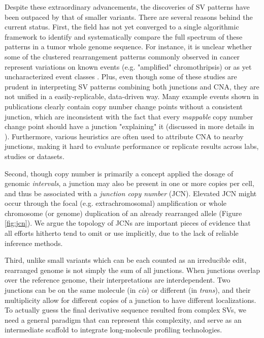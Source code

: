 \documentclass[phd,tocprelim]{cornell}
\begin{document}
Despite these extraordinary advancements, the discoveries of SV patterns have been outpaced by that of smaller variants. There are several reasons behind the current status. First, the field has not yet converged to a single algorithmic framework to identify and systematically compare the full spectrum of these patterns in a tumor whole genome sequence. For instance, it is unclear whether some of the clustered rearrangement patterns commonly observed in cancer represent variations on known events (e.g. "amplified" chromothripsis) or as yet uncharacterized event classes \cite{pcawg_marker2020-yi, Li2020sv}. Plus, even though some of these studies are prudent in interpreting SV patterns combining both junctions and CNA, they are not unified in a easily-replicable, data-driven way. Many example events shown in publications clearly contain copy number change points without a consistent junction, which are inconsistent with the fact that every \textit{mappable} copy number change point should have a junction "explaining" it (discussed in more details in \cite{Behr2021-gf}). Furthermore, various heuristics are often used to attribute CNA to nearby junctions, making it hard to evaluate performance or replicate results across labs, studies or datasets.

\clearpage
Second, though copy number is primarily a concept applied the dosage of genomic \textit{intervals}, a junction may also be present in one or more copies per cell, and thus be associated with a \textit{junction copy number} (JCN). Elevated JCN might occur through the focal (e.g. extrachromosomal) amplification \cite{Verhaak2019,Wu2019-ap} or whole chromosome (or genome) duplication of an already rearranged allele (Figure \ref{fig:jcn}). We argue the topology of JCNs are important pieces of evidence that all efforts hitherto tend to omit or use implicitly, due to the lack of reliable inference methods.

Third, unlike small variants which can be each counted as an irreducible edit, rearranged genome is not simply the sum of all junctions. When junctions overlap over the reference genome, their interpretations are interdependent. Two junctions can be on the same molecule (in \textit{cis}) or different (in \textit{trans}), and their multiplicity allow for different copies of a junction to have different localizations. To actually guess the final derivative sequence resulted from complex SVs, we need a general paradigm that can represent this complexity, and serve as an intermediate scaffold to integrate long-molecule profiling technologies.
\end{document}
